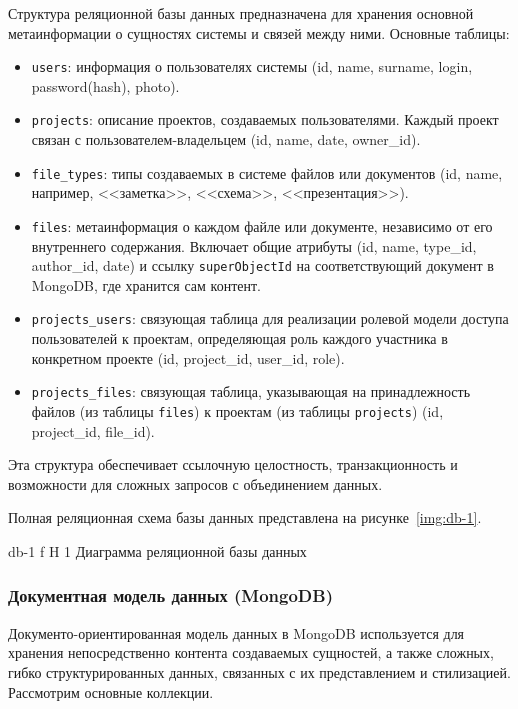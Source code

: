 Структура реляционной базы данных предназначена для хранения основной метаинформации о сущностях системы и связей между ними. 
\clearpage
Основные таблицы:

\begin{itemize}[wide=12.5mm, leftmargin=12.5mm]
    \item \texttt{users}: информация о пользователях системы (id, name, surname, login, password(hash), photo).
    \item \texttt{projects}: описание проектов, создаваемых пользователями. Каждый проект связан с пользователем-владельцем (id, name, date, owner\_id).
    \item \texttt{file\_types}: типы создаваемых в системе файлов или документов (id, name, например, <<заметка>>, <<схема>>, <<презентация>>).
    \item \texttt{files}: метаинформация о каждом файле или документе, независимо от его внутреннего содержания. Включает общие атрибуты (id, name, type\_id, author\_id, date) и ссылку \texttt{superObjectId} на соответствующий документ в MongoDB, где хранится сам контент.
    \item \texttt{projects\_users}: связующая таблица для реализации ролевой модели доступа пользователей к проектам, определяющая роль каждого участника в конкретном проекте (id, project\_id, user\_id, role).
    \item \texttt{projects\_files}: связующая таблица, указывающая на принадлежность файлов (из таблицы \texttt{files}) к проектам (из таблицы \texttt{projects}) (id, project\_id, file\_id).
\end{itemize}

Эта структура обеспечивает ссылочную целостность, транзакционность и возможности для сложных запросов с объединением данных. 

Полная реляционная схема базы данных представлена на рисунке~\ref{img:db-1}.

	{db-1}
	{f}
	{H}
	{1\textwidth}
	{Диаграмма реляционной базы данных}

\subsubsection{Документная модель данных (MongoDB)}

Документо-ориентированная модель данных в MongoDB используется для хранения непосредственно контента создаваемых сущностей, а также сложных, гибко структурированных данных, связанных с их представлением и стилизацией.
\clearpage
Рассмотрим основные коллекции.


